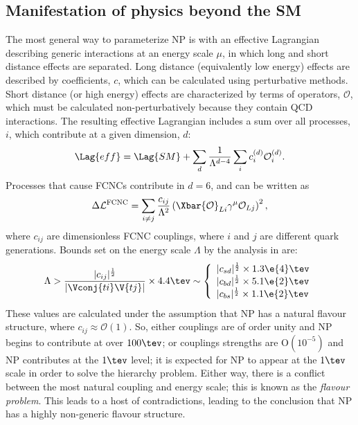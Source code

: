\subsection{Manifestation of physics beyond the SM}
\label{sec:th:bsm:man}

The most general way to parameterize NP is with an effective Lagrangian describing generic
interactions at an energy scale $\mu$, in which long and short distance effects are separated.
Long distance (equivalently low energy) effects are described by coefficients, $c$, which can be
calculated using perturbative methods.
Short distance (or high energy) effects are characterized by terms of operators, $\mathcal{O}$,
which must be calculated non-perturbatively because they contain QCD interactions.
The resulting effective Lagrangian includes a sum over all processes, $i$, which contribute at a
given dimension, $d$:
\begin{equation}
  \Lag{eff}
  =
  \Lag{SM} + \sum_d\frac1{\Lambda^{d-4}}
  \sum_ic_i^{(d)}\mathcal{O}_i^{(d)}.
  \label{eq:th:lageff}
\end{equation}
Processes that cause FCNCs contribute in $d=6$, and can be written as
\begin{equation}
  \Delta\mathcal{L}^\mathrm{FCNC}
  =
  \sum_{i\neq j}\frac{c_{ij}}{\Lambda^2}
  \left(\Xbar{\mathcal{O}}_{Li}\gamma^\mu\mathcal{O}_{Lj}\right)^2,
\end{equation}
where $c_{ij}$ are dimensionless FCNC couplings, where $i$ and $j$ are different quark generations.
Bounds set on the energy scale $\Lambda$ by the analysis in  are:
\begin{equation}
  \Lambda > \frac{|c_{ij}|^\frac12}{|\Vconj{ti}\V{tj}|}\times4.4\tev
  \sim
  \left\{
    \begin{array}{l}
      |c_{sd}|^\frac12\times 1.3\e{4}\tev \\
      |c_{bd}|^\frac12\times 5.1\e{2}\tev \\
      |c_{bs}|^\frac12\times 1.1\e{2}\tev \\
    \end{array}\right.
\end{equation}
These values are calculated under the assumption that NP has a natural flavour structure, where
$c_{ij}\approx\mathcal{O}(1)$.
So, either couplings are of order unity and NP begins to contribute at over $100\tev$; or couplings
strengths are $\mathrm{O}(10^{-5})$ and NP contributes at the $1\tev$ level;
it is expected for NP to appear at the $1\tev$ scale in order to solve the hierarchy problem.
Either way, there is a conflict between the most natural coupling and energy scale; this is known
as the \emph{flavour problem}.
This leads to a host of contradictions, leading to the conclusion that NP has a highly non-generic
flavour structure.

